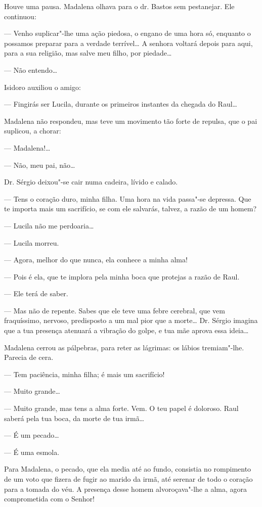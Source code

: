 Houve uma pausa. Madalena olhava para o dr. Bastos sem pestanejar. Ele
continuou:

--- Venho suplicar"-lhe uma ação piedosa, o engano de uma hora só,
enquanto o possamos preparar para a verdade terrível\ldots{} A senhora
voltará depois para aqui, para a sua religião, mas salve meu filho, por
piedade\ldots{}

--- Não entendo\ldots{}

Isidoro auxiliou o amigo:

--- Fingirás ser Lucila, durante os primeiros instantes
da chegada do Raul\ldots{}

Madalena não respondeu, mas teve um movimento tão forte de repulsa, que
o pai suplicou, a chorar:

--- Madalena!\ldots{}

--- Não, meu pai, não\ldots{}

Dr. Sérgio deixou"-se cair numa cadeira, lívido e calado.

--- Tens o coração duro, minha filha. Uma hora na vida passa"-se
depressa. Que te importa mais um sacrifício, se com ele salvarás,
talvez, a razão de um homem?

--- Lucila não me perdoaria\ldots{}

--- Lucila morreu.

--- Agora, melhor do que nunca, ela conhece a minha alma!

--- Pois é ela, que te implora pela minha boca que protejas a razão de
Raul.

--- Ele terá de saber.

--- Mas não de repente. Sabes que ele teve uma febre cerebral, que vem
fraquíssimo, nervoso, predisposto a um mal pior que a morte\ldots{} Dr.
Sérgio imagina que a tua presença atenuará a vibração do golpe, e tua
mãe aprova essa ideia\ldots{}

Madalena cerrou as pálpebras, para reter as lágrimas: os lábios
tremiam"-lhe. Parecia de cera.

--- Tem paciência, minha filha; é mais um sacrifício!

--- Muito grande\ldots{}

--- Muito grande, mas tens a alma forte. Vem. O teu papel é doloroso.
Raul saberá pela tua boca, da morte de tua irmã\ldots{}

--- É um pecado\ldots{}

--- É uma esmola.

Para Madalena, o pecado, que ela media até ao fundo, consistia no
rompimento de um voto que fizera de fugir ao marido da irmã, até serenar
de todo o coração para a tomada do véu. A presença desse homem
alvoroçava"-lhe a alma, agora comprometida com o Senhor!

